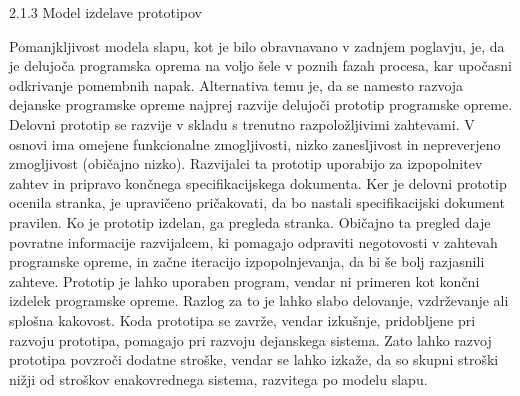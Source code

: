 \documentclass[a4paper,12pt,openright]{book}
\begin{document}
2.1.3 Model izdelave prototipov

Pomanjkljivost modela slapu, kot je bilo obravnavano v zadnjem poglavju, je, da je delujoča programska oprema na voljo šele v poznih fazah procesa, kar upočasni odkrivanje pomembnih napak. Alternativa temu je, da se namesto razvoja dejanske programske opreme najprej razvije delujoči prototip programske opreme. Delovni prototip se razvije v skladu s trenutno razpoložljivimi zahtevami. V osnovi ima omejene funkcionalne zmogljivosti, nizko zanesljivost in nepreverjeno zmogljivost (običajno nizko).
Razvijalci ta prototip uporabijo za izpopolnitev zahtev in pripravo končnega specifikacijskega dokumenta. Ker je delovni prototip ocenila stranka, je upravičeno pričakovati, da bo nastali specifikacijski dokument pravilen. Ko je prototip izdelan, ga pregleda stranka. Običajno ta pregled daje povratne informacije razvijalcem, ki pomagajo odpraviti negotovosti v zahtevah programske opreme, in začne iteracijo izpopolnjevanja, da bi še bolj razjasnili zahteve.
Prototip je lahko uporaben program, vendar ni primeren kot končni izdelek programske opreme. Razlog za to je lahko slabo delovanje, vzdrževanje ali splošna kakovost. Koda prototipa se zavrže, vendar izkušnje, pridobljene pri razvoju prototipa, pomagajo pri razvoju dejanskega sistema. Zato lahko razvoj prototipa povzroči dodatne stroške, vendar se lahko izkaže, da so skupni stroški nižji od stroškov enakovrednega sistema, razvitega po modelu slapu.

\cite{aggarwal2005software}
\end{document}

